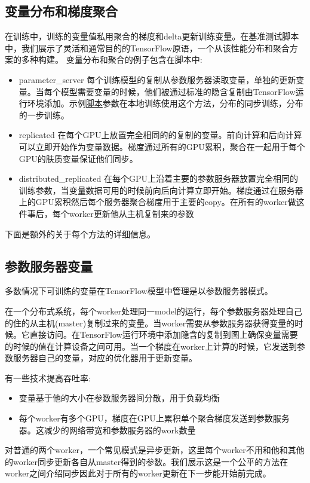 \subsection{变量分布和梯度聚合}
在训练中，训练的变量值私用聚合的梯度和delta更新训练变量。在基准测试脚本中，我们展示了灵活和通常目的的TensorFlow原语，一个从该性能分布和聚合方案的多种构建。
变量分布和聚合的例子包含在脚本中:
\begin{itemize}
	\item parameter\_server 每个训练模型的复制从参数服务器读取变量，单独的更新变量。当每个模型需要变量的时候，他们被通过标准的隐含复制由TensorFlow运行环境添加。示例\href{https://github.com/tensorflow/benchmarks/tree/master/scripts/tf_cnn_benchmarks}{脚本}参数在本地训练使用这个方法，分布的同步训练，分布的一步训练。
	\item replicated 在每个GPU上放置完全相同的的复制的变量。前向计算和后向计算可以立即开始作为变量数据。梯度通过所有的GPU累积，聚合在一起用于每个GPU的肤质变量保证他们同步。
	\item distributed\_replicated 在每个GPU上沿着主要的参数服务器放置完全相同的训练参数，当变量数据可用的时候前向后向计算立即开始。梯度通过在服务器上的GPU累积然后每个服务器聚合梯度用于主要的copy。在所有的worker做这件事后，每个worker更新他从主机复制来的参数
\end{itemize}
下面是额外的关于每个方法的详细信息。
\subsection{参数服务器变量}
多数情况下可训练的变量在TensorFlow模型中管理是以参数服务器模式。

在一个分布式系统，每个worker处理同一model的运行，每个参数服务器处理自己的住的从主机(master)复制过来的变量。当worker需要从参数服务器获得变量的时候。它直接访问。在TensorFlow运行环境中添加隐含的复制到图上确保变量需要的时候的值在计算设备之间可用。当一个梯度在worker上计算的时候，它发送到参数服务器自己的变量，对应的优化器用于更新变量。

有一些技术提高吞吐率:
\begin{itemize}
    \item 变量基于他的大小在参数服务器间分散，用于负载均衡
    \item 每个worker有多个GPU，梯度在GPU上累积单个聚合梯度发送到参数服务器。这减少的网络带宽和参数服务器的work数量
\end{itemize}
对普通的两个worker，一个常见模式是异步更新，这里每个worker不用和他和其他的worker同步更新各自从master得到的参数。我们展示这是一个公平的方法在worker之间介绍同步因此对于所有的worker更新在下一步能开始前完成。

